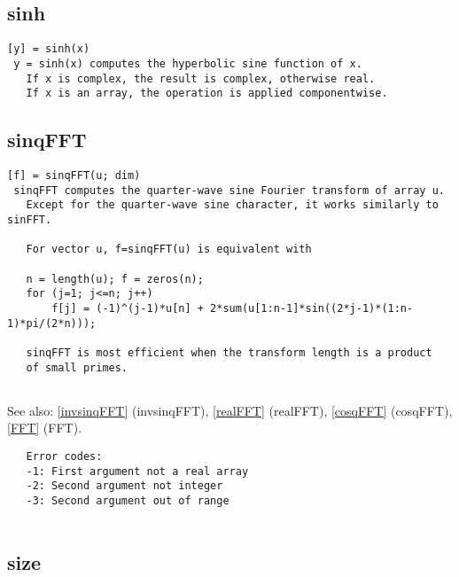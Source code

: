 \documentclass[a4paper]{article}
\begin{document}
\subsection{sinh\label{sinh}}

\begin{tscreen}
\begin{verbatim}
[y] = sinh(x)
 y = sinh(x) computes the hyperbolic sine function of x.
   If x is complex, the result is complex, otherwise real.
   If x is an array, the operation is applied componentwise.
\end{verbatim}
\end{tscreen}





\subsection{sinqFFT\label{sinqFFT}}

\begin{tscreen}
\begin{verbatim}
[f] = sinqFFT(u; dim)
 sinqFFT computes the quarter-wave sine Fourier transform of array u.
   Except for the quarter-wave sine character, it works similarly to sinFFT.
   
   For vector u, f=sinqFFT(u) is equivalent with

   n = length(u); f = zeros(n);
   for (j=1; j<=n; j++)
       f[j] = (-1)^(j-1)*u[n] + 2*sum(u[1:n-1]*sin((2*j-1)*(1:n-1)*pi/(2*n)));

   sinqFFT is most efficient when the transform length is a product
   of small primes.
           
\end{verbatim}

See also: \ref{invsinqFFT} {(invsinqFFT)}, \ref{realFFT} {(realFFT)}, \ref{cosqFFT} {(cosqFFT)}, \ref{FFT} {(FFT)}.
\begin{verbatim}
   Error codes:
   -1: First argument not a real array
   -2: Second argument not integer
   -3: Second argument out of range
   
\end{verbatim}
\end{tscreen}





\subsection{size\label{size}}
\end{document}
